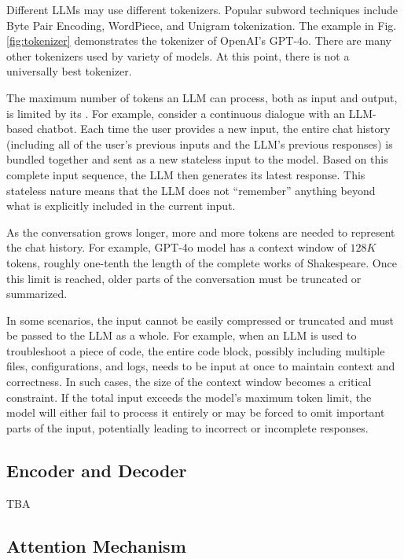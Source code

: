 Different LLMs may use different tokenizers. Popular subword techniques include Byte Pair Encoding, WordPiece, and Unigram tokenization. The example in Fig. \ref{fig:tokenizer} demonstrates the tokenizer of OpenAI's GPT-4o. There are many other tokenizers used by variety of models. At this point, there is not a universally best tokenizer.

The maximum number of tokens an LLM can process, both as input and output, is limited by its . For example, consider a continuous dialogue with an LLM-based chatbot. Each time the user provides a new input, the entire chat history (including all of the user's previous inputs and the LLM's previous responses) is bundled together and sent as a new stateless input to the model. Based on this complete input sequence, the LLM then generates its latest response. This stateless nature means that the LLM does not ``remember'' anything beyond what is explicitly included in the current input. 

As the conversation grows longer, more and more tokens are needed to represent the chat history. For example, GPT-4o model has a context window of $128K$ tokens, roughly one-tenth the length of the complete works of Shakespeare. Once this limit is reached, older parts of the conversation must be truncated or summarized.

In some scenarios, the input cannot be easily compressed or truncated and must be passed to the LLM as a whole. For example, when an LLM is used to troubleshoot a piece of code, the entire code block, possibly including multiple files, configurations, and logs, needs to be input at once to maintain context and correctness. In such cases, the size of the context window becomes a critical constraint. If the total input exceeds the model's maximum token limit, the model will either fail to process it entirely or may be forced to omit important parts of the input, potentially leading to incorrect or incomplete responses.



\subsection{Encoder and Decoder}

TBA

\subsection{Attention Mechanism}

